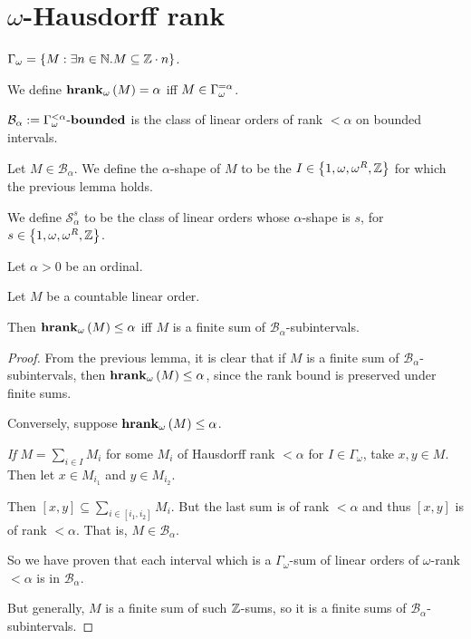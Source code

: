 

\section{$\omega$-Hausdorff rank}

\begin{definitions}
  $\Gamma_{\omega} = \left\{ {M : \exists n \in \mathbb{N} . M \subseteq \mathbb{Z} \cdot n} \right\}$.

  We define $\mathbf{hrank}_{\omega}\left( M \right) = \alpha$ iff $M \in \Gamma_{\omega}^{= \alpha}$.

  $\mathcal{B}_{\alpha} := {\Gamma_{\omega}^{< \alpha}} \text{-} \mathbf{bounded}$ is the class
  of linear orders of rank $< \alpha$ on bounded intervals.
\end{definitions}


\begin{definition}
  Let $M \in \mathcal{B}_{\alpha}$. We define the $\alpha$-shape
  of $M$ to be the $I \in \left\{ {1, \omega, \omega^R, \mathbb{Z}} \right\}$ 
  for which the previous lemma holds.

  We define $\mathcal{S}^{s}_{\alpha}$ to be the class of linear orders
  whose $\alpha$-shape is $s$, for $s \in \left\{ {1, \omega, \omega^R, \mathbb{Z}} \right\}$.
\end{definition}

\begin{lemma}
  Let $\alpha > 0$ be an ordinal.

  Let $M$ be a countable linear order.

  Then $\mathbf{hrank}_{\omega}\left( M \right) \le \alpha$ iff $M$ is a finite sum of $\mathcal{B}_{\alpha}$-subintervals.
\end{lemma}

\begin{proof}
  From the previous lemma, it is clear that if $M$ is a finite sum of $\mathcal{B}_{\alpha}$-subintervals,
  then $\mathbf{hrank}_{\omega}\left( M \right) \le \alpha$, since the rank bound is preserved under finite sums.

  Conversely, suppose $\mathbf{hrank}_{\omega}\left( M \right) \le \alpha$.

  \emph{If} $M = \sum_{i \in I} M_i$ for some $M_i$ of Hausdorff rank $< \alpha$ for $I \in \Gamma_{\omega}$,
  take $x, y \in M$. Then let $x \in M_{i_1}$ and $y \in M_{i_2}$.

  Then $[x, y] \subseteq \sum_{i \in [i_1, i_2]} M_i$. But the last sum is of rank $< \alpha$
  and thus $[x, y]$ is of rank $< \alpha$. That is, $M \in \mathcal{B}_{\alpha}$.

  So we have proven that each interval which is a $\Gamma_{\omega}$-sum of linear orders of
  $\omega$-rank $< \alpha$ is in $\mathcal{B}_{\alpha}$.

  But generally, $M$ is a finite sum of such $\mathbb{Z}$-sums, so it is a finite sums
  of $\mathcal{B}_{\alpha}$-subintervals.
\end{proof}

